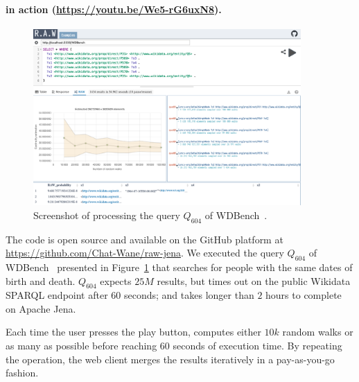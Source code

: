 \paragraph{\NAME in action (\url{https://youtu.be/We5-rG6uxN8}).}


 \begin{figure}
   \centering
   \includegraphics[width=0.91\textwidth]{figures/raw_screenshot.png}
   \caption{\label{fig:raw_screenshot} Screenshot of \NAME processing the query $Q_{604}$ of
     WDBench~\cite{angles2022wdbench}.}
 \end{figure}

The code is open source and available on the GitHub platform at
\url{https://github.com/Chat-Wane/raw-jena}.  We executed the query
$Q_{604}$ of WDBench~\cite{angles2022wdbench} presented in
Figure~\ref{fig:raw_screenshot} that searches for people with the same
dates of birth and death. $Q_{604}$ expects $25M$ results, but times
out on the public Wikidata SPARQL endpoint after $60$ seconds; and
takes longer than $2$ hours to complete on Apache Jena.


\noindent Each time the user presses the play button, \NAME computes
either $10k$ random walks or as many as possible before reaching $60$
seconds of execution time. By repeating the operation, the web client
merges the results iteratively in a pay-as-you-go fashion.


